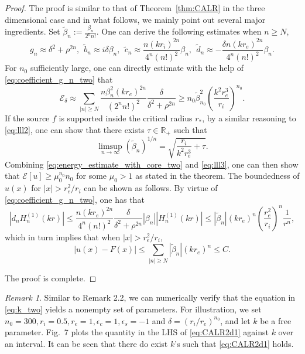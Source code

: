 \documentclass[11pt,reqno,twoside]{amsart}
\theoremstyle{definition}
\theoremstyle{remark}
\newtheorem{rem}{Remark}[section]
\numberwithin{equation}{section}
\begin{document}
\begin{proof}

The proof is similar to that of Theorem~\ref{thm:CALR} in the three dimensional case and in what follows, we mainly point out several major ingredients. Set $\tilde{\beta}_n:=\frac{{\beta}_n}{ 2^n n!}$. One can derive the following estimates when $n\geq N$, 
\begin{equation}\label{eq:coefficient_g_n_two}
  g_{n}\approx \delta^2 + \rho^{2n},\ \  \tilde{b}_{n}\approx i\delta \beta_{n},\ \ 
 \tilde{c}_{n}\approx \frac{n (kr_i)^{2n}}{4^{n}(n!)^2} \beta_{n},\ \  \tilde{d}_{n}\approx -\frac{\delta n (kr_e)^{2n}}{4^n (n!)^2}\beta_{n}.
\end{equation}
For $n_0$ sufficiently large, one can directly estimate with the help of \eqref{eq:coefficient_g_n_two} that 
\begin{equation}\label{eq:energy_estimate_with_core_two}
   \mathscr{E}_{\delta}\approx \sum_{|n|\geq N} \frac{n\beta_n^2 (k r_e)^{2n}}{(2^n n!)^2} \frac{\delta}{\delta^2+\rho^{2n}}\geq n_0\tilde{\beta}_{n_0}^2 \left(\frac{k^2 r_e^3}{r_i} \right)^{n_0}.
\end{equation}
If the source $f$ is supported inside the critical radius $r_*$, by a similar reasoning to \eqref{eq:lll2}, one can show that there exists $\tau\in\mathbb{R}_+$ such that
\begin{equation}\label{eq:lll3}
  \limsup_{n\rightarrow\infty}\left(\tilde{\beta}_n \right)^{1/n}=\sqrt{\frac{r_i}{k^2r_e^3}+\tau}. 
\end{equation}
Combining \eqref{eq:energy_estimate_with_core_two} and \eqref{eq:lll3}, one can then show that $\mathscr{E}[u]\geq \mu_0^{n_0} n_0$ for some $\mu_0>1$ as stated in the theorem. The boundedness of $u(x)$ for $|x|>r_e^2/r_i$ can be shown as follows. By virtue of \eqref{eq:coefficient_g_n_two}, one has that
\begin{equation}\label{eq:estimate_d_n0_two}
   |d_{n}H_{n}^{(1)}(kr)| \leq \frac{n (kr_e)^{2n}}{4^n (n!)^2} \frac{\delta}{\delta^2+\rho^{2n}} |\beta_{n}| |H_{n}^{(1)}(kr)|\leq |\tilde{\beta}_{n}| (kr_e)^n \left(\frac{r_e^2}{r_i}\right)^n \frac{1}{r^n},
\end{equation}
which in turn implies that when $|x|>r_e^2/r_i$,
\[
 |u(x)-F(x)|\leq \sum_{|n|\geq N}|\tilde{\beta}_{n}| (kr_e)^n\leq C.
\]

The proof is complete. 
\end{proof}

\begin{rem}
Similar to Remark 2.2, we can numerically verify that the equation in \eqref{eq:k_two} yields a nonempty set of parameters. For illustration, we set $n_0=300, r_i=0.5, r_e=1, \epsilon_c=1, \epsilon_s=-1$ and $\delta=(r_i/r_e)^{n_0}$, and let $k$ be a free parameter. Fig.~7 plots the quantity in the LHS of \eqref{eq:CALR2d1} against $k$ over an interval. It can be seen that there do exist $k$'s such that  \eqref{eq:CALR2d1} holds. 
\end{rem}
\end{document}
